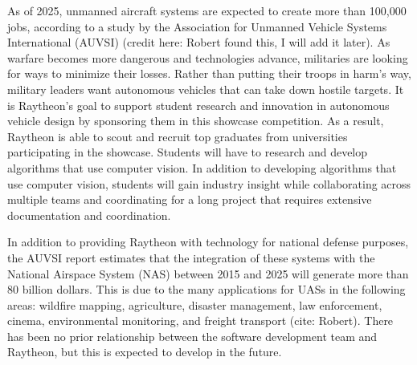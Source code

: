 

As of 2025, unmanned aircraft systems are expected to create more than 100,000 jobs, according to a study by the Association for Unmanned Vehicle Systems International (AUVSI) (credit here: Robert found this, I will add it later). As warfare becomes more dangerous and technologies advance, militaries are looking for ways to minimize their losses. Rather than putting their troops in harm's way, military leaders want autonomous vehicles that can take down hostile targets. It is Raytheon's goal to support student research and innovation in autonomous vehicle design by sponsoring them in this showcase competition. As a result, Raytheon is able to scout and recruit top graduates from universities participating in the showcase. Students will have to research and develop algorithms that use computer vision. In addition to developing algorithms that use computer vision, students will gain industry insight while collaborating across multiple teams and coordinating for a long project that requires extensive documentation and coordination.

In addition to providing Raytheon with technology for national defense purposes, the AUVSI report estimates that the integration of these systems with the National Airspace System (NAS) between 2015 and 2025 will generate more than 80 billion dollars. This is due to the many applications for UASs in the following areas: wildfire mapping, agriculture, disaster management, law enforcement, cinema, environmental monitoring, and freight transport (cite: Robert). There has been no prior relationship between the software development team and Raytheon, but this is expected to develop in the future.
